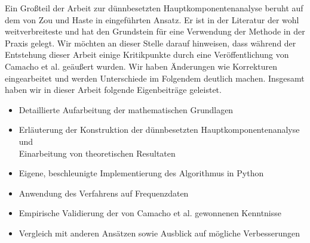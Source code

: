 Ein Großteil der Arbeit zur dünnbesetzten Hauptkomponentenanalyse beruht auf dem von Zou und Haste in \cite{zou_sparsepca} eingeführten Ansatz. Er ist in der Literatur der wohl weitverbreiteste und hat den Grundstein für eine Verwendung der Methode in der Praxis gelegt. Wir möchten an dieser Stelle darauf hinweisen, dass während der Entstehung dieser Arbeit einige Kritikpunkte durch eine Veröffentlichung von Camacho et al. \cite{camacho} geäußert wurden. Wir haben Änderungen wie Korrekturen eingearbeitet und werden Unterschiede im Folgendem deutlich machen. Insgesamt haben wir in dieser Arbeit folgende Eigenbeiträge geleistet.
\begin{itemize}
\item Detaillierte Aufarbeitung der mathematischen Grundlagen
\item Erläuterung der Konstruktion der dünnbesetzten Hauptkomponentenanalyse und\\ Einarbeitung von theoretischen Resultaten
\item Eigene, beschleunigte Implementierung des Algorithmus in Python
\item Anwendung des Verfahrens auf Frequenzdaten
\item Empirische Validierung der von Camacho et al. gewonnenen Kenntnisse
\item Vergleich mit anderen Ansätzen sowie Ausblick auf mögliche Verbesserungen
\end{itemize}
